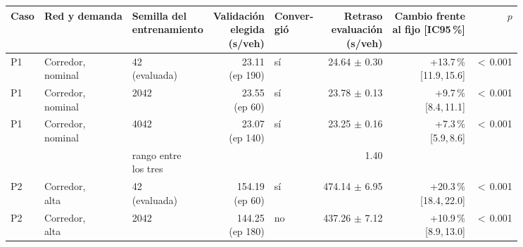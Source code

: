 \begin{table}[H]
\centering
\scriptsize
\setlength{\tabcolsep}{3pt}
\begin{tabular}{lllrlrrr}
\toprule
Caso & Red y demanda & \makecell{Semilla del\\entrenamiento} & \makecell{Validación\\elegida\\(s/veh)} & \makecell{Conver-\\gió} & \makecell{Retraso\\evaluación\\(s/veh)} & \makecell{Cambio frente\\al fijo [IC95\,\%]} & $p$ \\
\midrule
P1 & \makecell[l]{Corredor,\\{}nominal} & \makecell[l]{42\\{}(evaluada)} & \makecell[r]{23.11\\{}(ep 190)} & sí & \makecell[r]{24.64\\{}$\pm$ 0.30} & \makecell[r]{+13.7\,\%\\{}[11.9,\,15.6]} & $<$\,0.001 \\
P1 & \makecell[l]{Corredor,\\{}nominal} & 2042 & \makecell[r]{23.55\\{}(ep 60)} & sí & \makecell[r]{23.78\\{}$\pm$ 0.13} & \makecell[r]{+9.7\,\%\\{}[8.4,\,11.1]} & $<$\,0.001 \\
P1 & \makecell[l]{Corredor,\\{}nominal} & 4042 & \makecell[r]{23.07\\{}(ep 140)} & sí & \makecell[r]{23.25\\{}$\pm$ 0.16} & \makecell[r]{+7.3\,\%\\{}[5.9,\,8.6]} & $<$\,0.001 \\
 & & \makecell[l]{rango entre\\{}los tres} & & & 1.40 & & \\
P2 & \makecell[l]{Corredor,\\{}alta} & \makecell[l]{42\\{}(evaluada)} & \makecell[r]{154.19\\{}(ep 60)} & sí & \makecell[r]{474.14\\{}$\pm$ 6.95} & \makecell[r]{+20.3\,\%\\{}[18.4,\,22.0]} & $<$\,0.001 \\
P2 & \makecell[l]{Corredor,\\{}alta} & 2042 & \makecell[r]{144.25\\{}(ep 180)} & no & \makecell[r]{437.26\\{}$\pm$ 7.12} & \makecell[r]{+10.9\,\%\\{}[8.9,\,13.0]} & $<$\,0.001 \\

\end{tabular}
\end{table}
